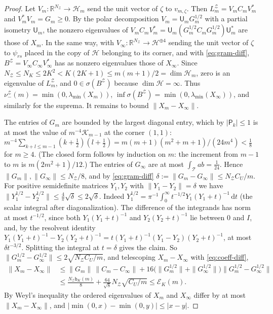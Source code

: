 \documentclass[preprint,12pt,a4paper]{elsarticle}
\theoremstyle{remark}
\newcommand{\R}{\mathbb R}
\newcommand{\dd}{\,\mathrm d}
\begin{document}
\begin{proof}
Let $V_m:\R^{N_{\mathcal Z}}\to\mathcal H_m$ send the unit vector of $\zeta$ to $v_{m,\zeta}$. Then
$L_m^{\mathcal Z}=V_mC_mV_m^*$ and $V_m^*V_m=G_m\ge0$. By the polar decomposition
$V_m=\mathsf U_mG_m^{1/2}$ with a partial isometry $\mathsf U_m$, the nonzero eigenvalues of
$V_mC_mV_m^*=\mathsf U_m(G_m^{1/2}C_mG_m^{1/2})\mathsf U_m^*$ are those of $X_m$. In the same way,
with $V_\infty:\R^{N_{\mathcal Z}}\to\mathcal H^{\oplus4}$ sending the unit vector of $\zeta$ to
$\psi_{rs}$ placed in the copy of $\mathcal H$ belonging to its corner, and with
\eqref{eq:gram-diff}, $B^{\mathcal Z}=V_\infty C_\infty V_\infty^*$ has as nonzero
eigenvalues those of $X_\infty$. Since $N_{\mathcal Z}\le N_K\le2K^2<K(2K+1)\le m(m+1)/2=\dim\mathcal H_m$,
zero is an eigenvalue of $L_m^{\mathcal Z}$, and $0\in\sigma(B^{\mathcal Z})$ because
$\dim\mathcal H=\infty$. Thus $\nu^{\mathcal Z}_-(m)=\min(0,\lambda_{\min}(X_m))$,
$\inf\sigma(B^{\mathcal Z})=\min(0,\lambda_{\min}(X_\infty))$, and similarly for the
suprema. It remains to bound $\|X_m-X_\infty\|$.

The entries of $G_m$ are bounded by the largest diagonal entry, which by
$|\mathsf P_k|\le1$ is at most the value of $m^{-4}\mathcal K_{m-1}$ at the corner
$(1,1)$:
$m^{-4}\sum_{k+l\le m-1}(k+\frac12)(l+\frac12)=m(m+1)(m^2+m+1)/(24m^4)<\frac18$
for $m\ge4$. (The closed form follows by induction on $m$: the increment from
$m-1$ to $m$ is $m(2m^2+1)/12$.) The entries of $G_\infty$ are at most
$\int_{\mathcal T}ab=\frac1{24}$. Hence $\|G_m\|,\|G_\infty\|\le N_{\mathcal Z}/8$, and by
\eqref{eq:gram-diff} $\delta:=\|G_m-G_\infty\|\le N_{\mathcal Z}C_U/m$.
For positive semidefinite matrices $Y_1,Y_2$ with $\|Y_1-Y_2\|=\delta$ we have
$\|Y_1^{1/2}-Y_2^{1/2}\|\le\frac4\pi\sqrt\delta\le2\sqrt\delta$. Indeed
$Y_1^{1/2}=\pi^{-1}\int_0^\infty t^{-1/2}Y_1(Y_1+t)^{-1}\dd t$ (the scalar integral after
diagonalization). The difference of the integrands has norm at most $t^{-1/2}$,
since both $Y_1(Y_1+t)^{-1}$ and $Y_2(Y_2+t)^{-1}$ lie between $0$ and $I$, and, by the
resolvent identity $Y_1(Y_1+t)^{-1}-Y_2(Y_2+t)^{-1}=t(Y_1+t)^{-1}(Y_1-Y_2)(Y_2+t)^{-1}$, at most
$\delta t^{-3/2}$. Splitting the integral at $t=\delta$ gives the claim.
So $\|G_m^{1/2}-G_\infty^{1/2}\|\le2\sqrt{N_{\mathcal Z}C_U/m}$, and telescoping
$X_m-X_\infty$ with \eqref{eq:coeff-diff},
\begin{align*}
 \|X_m-X_\infty\|&\le\|G_m\|\,\|C_m-C_\infty\|
  +16\bigl(\|G_m^{1/2}\|+\|G_\infty^{1/2}\|\bigr)\|G_m^{1/2}-G_\infty^{1/2}\|\\
 &\le\frac{N_{\mathcal Z}\mathsf b_K(m)}8+\frac{64}{\sqrt8}N_{\mathcal Z}\sqrt{C_U/m}\le \mathcal E_K(m).
\end{align*}
By Weyl's inequality the ordered eigenvalues of $X_m$ and $X_\infty$ differ by at
most $\|X_m-X_\infty\|$, and $|\min(0,x)-\min(0,y)|\le|x-y|$.
\end{proof}
\end{document}
